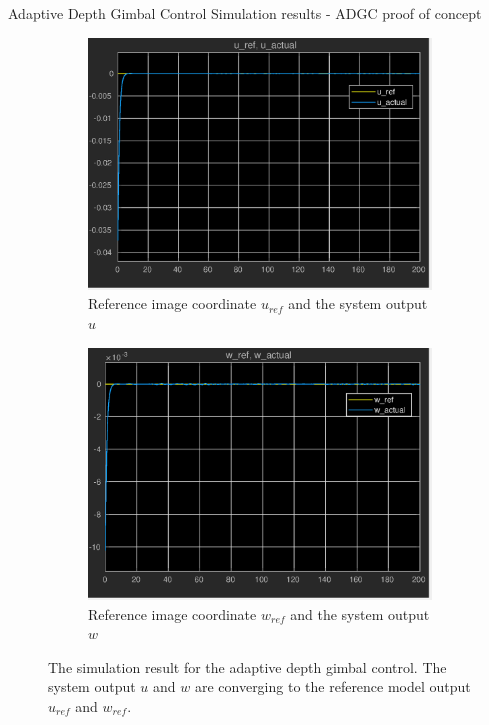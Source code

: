 \documentclass[9pt]{beamer}
\newenvironment{figure*}%
{\begin{figure}}
{\end{figure}}
\begin{document}
\begin{frame}{Adaptive Depth Gimbal Control}
Simulation results - ADGC proof of concept
	\begin{figure}[htbp]
		\centering
		\begin{subfigure}{0.5\textwidth}
			\centering
			\includegraphics[width=0.8\linewidth]{chapter2/u_adaptive}
			\caption{Reference image coordinate $u_{ref}$ and the system output $u$}
		\end{subfigure}%
		\begin{subfigure}{0.5\textwidth}
			\centering
			\includegraphics[width=0.8\linewidth]{chapter2/w_adaptive}
			\caption{Reference image coordinate $w_{ref}$ and the system output $w$}
		\end{subfigure}
		\caption{The simulation result for the adaptive depth gimbal control. The system output $u$ and $w$ are converging to the reference model output $u_{ref}$ and $w_{ref}$.}
		\label{adaptive_result}
	\end{figure}
\end{frame}
\end{document}
